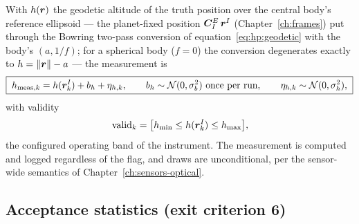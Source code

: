 With $h(\bm{r})$ the geodetic altitude of the truth position over the
central body's reference ellipsoid --- the planet-fixed position
$\bm{C}_{I}^{E}\,\bm{r}^{I}$ (Chapter~\ref{ch:frames}) put through the
Bowring two-pass conversion of
equation~\eqref{eq:hp:geodetic} with the body's $(a, 1/f)$; for a
spherical body ($f = 0$) the conversion degenerates exactly to
$h = \left\lVert \bm{r} \right\rVert - a$ --- the measurement is
\begin{equation}
  \boxed{\;
  h_{\mathrm{meas},k} = h(\bm{r}^{I}_k) + b_h + \eta_{h,k},
  \qquad
  b_h \sim \mathcal{N}(0, \sigma_{b}^2) \text{ once per run},
  \qquad
  \eta_{h,k} \sim \mathcal{N}(0, \sigma_{h}^2),
  \;}
  \label{eq:radio:alt}
\end{equation}
with validity
\begin{equation}
  \mathrm{valid}_k = \bigl[h_{\min} \le h(\bm{r}^{I}_k) \le
    h_{\max}\bigr],
  \label{eq:radio:altgate}
\end{equation}
the configured operating band of the instrument. The measurement is
computed and logged regardless of the flag, and draws are unconditional,
per the sensor-wide semantics of Chapter~\ref{ch:sensors-optical}.

\subsection{Acceptance statistics (exit criterion 6)}
\label{sec:radio:stats}

